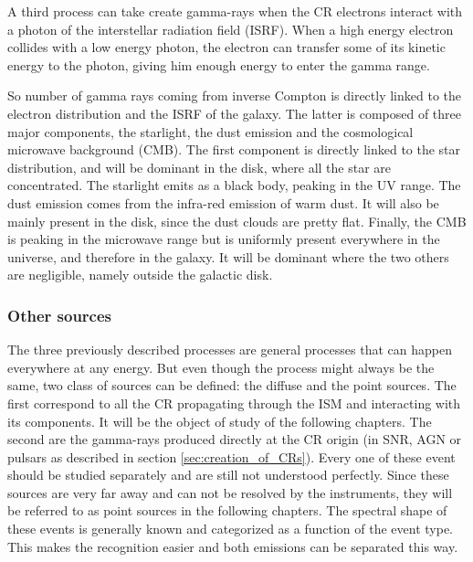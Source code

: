 A third process can take create gamma-rays when the CR electrons interact with a photon of the interstellar radiation field (ISRF). When a high energy electron collides with a low energy photon, the electron can transfer some of its kinetic energy to the photon, giving him enough energy to enter the gamma range.

So number of gamma rays coming from inverse Compton is directly linked to the electron distribution and the ISRF of the galaxy. The latter is composed of three major components, the starlight, the dust emission and the cosmological microwave background (CMB). The first component is directly linked to the star distribution, and will be dominant in the disk, where all the star are concentrated. The starlight emits as a black body, peaking in the UV range. The dust emission comes from the infra-red emission of warm dust. It will also be mainly present in the disk, since the dust clouds are pretty flat. Finally, the CMB is peaking in the microwave range but is uniformly present everywhere in the universe, and therefore in the galaxy. It will be dominant where the two others are negligible, namely outside the galactic disk.



\subsubsection{Other sources}

The three previously described processes are general processes that can happen everywhere at any energy. But even though the process might always be the same, two class of sources can be defined: the diffuse and the point sources. 
The first correspond to all the CR propagating through the ISM and interacting with its components. It will be the object of study of the following chapters. 
The second are the gamma-rays produced directly at the CR origin (in SNR, AGN or pulsars as described in section \ref{sec:creation_of_CRs}). Every one of these event should be studied separately and are still not understood perfectly. Since these sources are very far away and can not be resolved by the instruments, they will be referred to as point sources in the following chapters. The spectral shape of these events is generally known and categorized as a function of the event type. This makes the recognition easier and both emissions can be separated 
this way.


